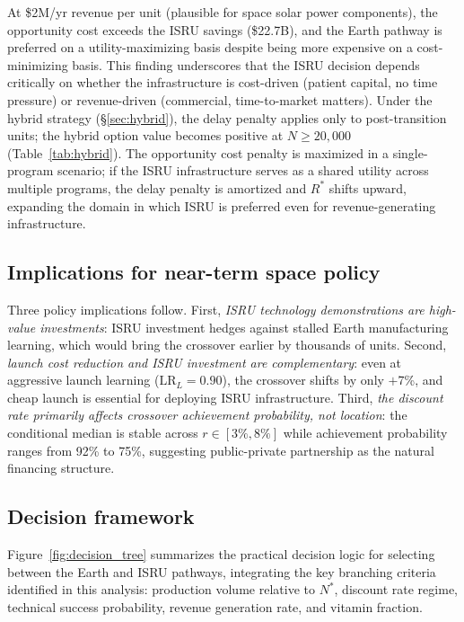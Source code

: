 \documentclass[5p,twocolumn]{elsarticle}
\begin{document}
At \$2M/yr revenue per unit (plausible for space solar power components), the opportunity cost exceeds the ISRU savings (\$22.7B), and the Earth pathway is preferred on a utility-maximizing basis despite being more expensive on a cost-minimizing basis. This finding underscores that the ISRU decision depends critically on whether the infrastructure is cost-driven (patient capital, no time pressure) or revenue-driven (commercial, time-to-market matters). Under the hybrid strategy (\S\ref{sec:hybrid}), the delay penalty applies only to post-transition units; the hybrid option value becomes positive at $N \geq 20{,}000$ (Table~\ref{tab:hybrid}). The opportunity cost penalty is maximized in a single-program scenario; if the ISRU infrastructure serves as a shared utility across multiple programs, the delay penalty is amortized and $R^*$ shifts upward, expanding the domain in which ISRU is preferred even for revenue-generating infrastructure.

\subsection{Implications for near-term space policy}

Three policy implications follow. First, \emph{ISRU technology demonstrations are high-value investments}: ISRU investment hedges against stalled Earth manufacturing learning, which would bring the crossover earlier by thousands of units. Second, \emph{launch cost reduction and ISRU investment are complementary}: even at aggressive launch learning ($\mathrm{LR}_L = 0.90$), the crossover shifts by only $+$7\%, and cheap launch is essential for deploying ISRU infrastructure. Third, \emph{the discount rate primarily affects crossover achievement probability, not location}: the conditional median is stable across $r \in [3\%, 8\%]$ while achievement probability ranges from 92\% to 75\%, suggesting public-private partnership as the natural financing structure.

\subsection{Decision framework}

Figure~\ref{fig:decision_tree} summarizes the practical decision logic for selecting between the Earth and ISRU pathways, integrating the key branching criteria identified in this analysis: production volume relative to $N^*$, discount rate regime, technical success probability, revenue generation rate, and vitamin fraction.
\end{document}
